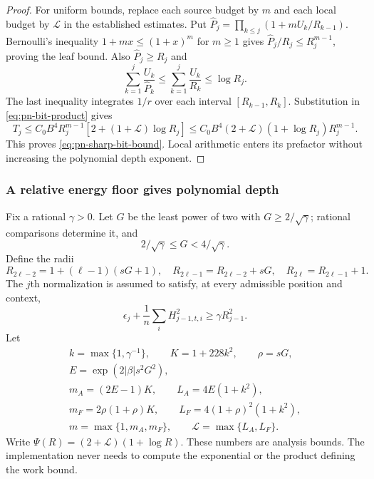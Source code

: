 \begin{proof}
For uniform bounds, replace each source budget by $m$ and each
local budget by $\mathcal L$ in the established estimates. Put
$\widehat P_j=\prod_{k\le j}(1+mU_k/R_{k-1})$. Bernoulli's inequality
$1+mx\le(1+x)^m$ for $m\ge1$ gives
$\widehat P_j/R_j\le R_j^{m-1}$, proving the leaf bound.
Also $\widehat P_j\ge R_j$ and
\[
 \sum_{k=1}^j\frac{U_k}{\widehat P_k}
 \le\sum_{k=1}^j\frac{U_k}{R_k}
 \le\log R_j.
\]
The last inequality integrates $1/r$ over each interval
$[R_{k-1},R_k]$. Substitution in \eqref{eq:pn-bit-product} gives
\[
 T_j\le C_0B^4 R_j^{m-1}[2+(1+\mathcal L)\log R_j]
 \le C_0B^4(2+\mathcal L)(1+\log R_j)R_j^{m-1}.
\]
This proves \eqref{eq:pn-sharp-bit-bound}. Local arithmetic enters
its prefactor without increasing the polynomial depth exponent.
\end{proof}

\subsubsection{A relative energy floor gives polynomial depth}

Fix a rational $\gamma>0$. Let $G$ be the least power of two with
$G\ge2/\sqrt\gamma$; rational comparisons determine it, and
\[
 2/\sqrt\gamma\le G<4/\sqrt\gamma.
\]
Define the radii
\[
 R_{2\ell-2}=1+(\ell-1)(sG+1),\quad
 R_{2\ell-1}=R_{2\ell-2}+sG,\quad
 R_{2\ell}=R_{2\ell-1}+1.
\]
The $j$th normalization is assumed to satisfy, at every admissible
position and context,
\begin{equation}
 \epsilon_j+\frac1n\sum_i H_{j-1,t,i}^2
       \ge\gamma R_{j-1}^2.
 \label{eq:pn-relative-floor}
\end{equation}
Let
\begin{gather*}
 k=\max\{1,\gamma^{-1}\},\qquad K=1+228k^2,\qquad \rho=sG,\\
 E=\exp(2|\beta|s^2G^2),\\
 m_A=(2E-1)K,\qquad L_A=4E(1+k^2),\\
 m_F=2\rho(1+\rho)K,\qquad L_F=4(1+\rho)^2(1+k^2),\\
 m=\max\{1,m_A,m_F\},\qquad
 \mathcal L=\max\{L_A,L_F\}.
\end{gather*}
Write $\Psi(R)=(2+\mathcal L)(1+\log R)$. These numbers are analysis bounds. The implementation never needs to
compute the exponential or the product defining the work bound.

